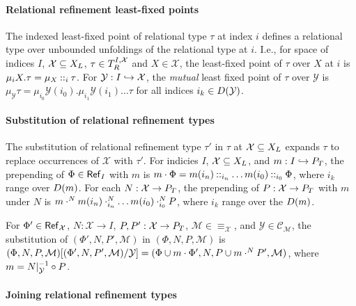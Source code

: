 \paragraph{Relational refinement least-fixed points}
The indexed least-fixed point of relational type $\tau$ at index $i$
defines a relational type over unbounded unfoldings of the relational
type at $i$.
%
I.e., for space of indices $I$, $\mathcal{X} \subseteq X_L$,
$\tau \in T_{R}^{I, \mathcal{X}}$ and $X \in \mathcal{X}$, the
least-fixed point of $\tau$ over $X$ at $i$ is $\mu_i X. \tau = %
\mu_X \prepend{i} \tau$.
%
For $\mathcal{Y} : I \hookrightarrow \mathcal{X}$, the \emph{mutual} least
fixed point of $\tau$ over $\mathcal{Y}$ is
$\mu_\mathcal{Y} \tau = \mu_{i_0} \mathcal{Y}(i_0). \mu_{i_1}
\mathcal{Y}(i_1) \ldots \tau$ for all indices
$i_k \in D(\mathcal{Y})$.

\paragraph{Substitution of relational refinement types}
%
The substitution of relational refinement type $\tau'$ in $\tau$ at
$\mathcal{X} \subseteq X_L$ expands $\tau$ to replace occurrences
of $\mathcal{X}$ with $\tau'$.
%
For indicies $I$, $\mathcal{X} \subseteq X_L$, and %
$m : I \hookrightarrow P_T$, the prepending of $\Phi \in \mathsf{Ref}_{ I }$
with $m$ is
$m \cdot \Phi = m(i_n) \mathbin{::}_{i_n} \ldots m(i_0) \mathbin{::}_{i_0}
\Phi$, where $i_k$ range over $D(m)$.
%
For each $N : \mathcal{X} \to P_T$, the prepending of
$P : \mathcal{X} \to P_T$ with $m$ under $N$ is
$m \cdot^N m(i_n) \cdot_{i_n}^{N} \ldots m(i_0)
\cdot_{i_0}^{N} P$, where $i_k$ range over the $D(m)$.

For $\Phi' \in \mathsf{Ref}_{ \mathcal{X} }$, %
$N : \mathcal{X} \to I$, %
$P, P' : \mathcal{X} \to P_T$, %
$\mathcal{M} \in \equiv_{\mathcal{X}}$, and %
$\mathcal{Y} \in \mathcal{C}_{\mathcal{M}}$, the substitution of
$(\Phi', N, P', \mathcal{M})$ in $(\Phi, N, P, \mathcal{M})$ is %
$\replace{ (\Phi, N, P, \mathcal{M}) }{ \mathcal{Y} }{ %
  (\Phi', N, P', \mathcal{M}) } = %
(\Phi \union m \concat \Phi', N, %
P \union m \concat^N P', \mathcal{M})$, where
$m = N|_{ \mathcal{Y} } ^{-1} \circ P$.


\paragraph{Joining relational refinement types}

